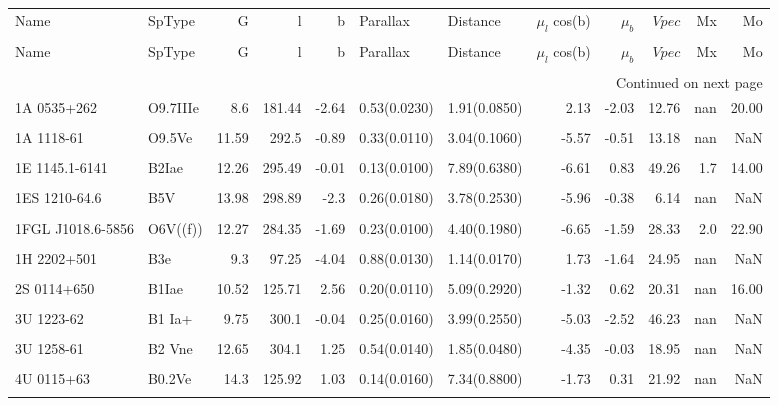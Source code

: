 \begin{longtable}{llrrrllrrrrr}
\toprule
Name & SpType & G & l & b & Parallax & Distance & $\mu_l$ cos(b) & $\mu_b$ & $V pec$ & Mx & Mo \\ \\
\midrule
\endfirsthead
\toprule
Name & SpType & G & l & b & Parallax & Distance & $\mu_l$ cos(b) & $\mu_b$ & $V pec$ & Mx & Mo \\ \\
\midrule
\endhead
\midrule
\multicolumn{12}{r}{Continued on next page} \\
\midrule
\endfoot
\bottomrule
\endlastfoot
1A 0535+262 & O9.7IIIe & 8.6 & 181.44 & -2.64 & 0.53(0.0230) & 1.91(0.0850) & 2.13 & -2.03 & 12.76 & nan & 20.00 \\ \\
1A 1118-61 & O9.5Ve & 11.59 & 292.5 & -0.89 & 0.33(0.0110) & 3.04(0.1060) & -5.57 & -0.51 & 13.18 & nan & NaN \\ \\
1E 1145.1-6141 & B2Iae & 12.26 & 295.49 & -0.01 & 0.13(0.0100) & 7.89(0.6380) & -6.61 & 0.83 & 49.26 & 1.7 & 14.00 \\ \\
1ES 1210-64.6 & B5V & 13.98 & 298.89 & -2.3 & 0.26(0.0180) & 3.78(0.2530) & -5.96 & -0.38 & 6.14 & nan & NaN \\ \\
1FGL J1018.6-5856 & O6V((f)) & 12.27 & 284.35 & -1.69 & 0.23(0.0100) & 4.40(0.1980) & -6.65 & -1.59 & 28.33 & 2.0 & 22.90 \\ \\
1H 2202+501 & B3e & 9.3 & 97.25 & -4.04 & 0.88(0.0130) & 1.14(0.0170) & 1.73 & -1.64 & 24.95 & nan & NaN \\ \\
2S 0114+650 & B1Iae & 10.52 & 125.71 & 2.56 & 0.20(0.0110) & 5.09(0.2920) & -1.32 & 0.62 & 20.31 & nan & 16.00 \\ \\
3U 1223-62 & B1 Ia+ & 9.75 & 300.1 & -0.04 & 0.25(0.0160) & 3.99(0.2550) & -5.03 & -2.52 & 46.23 & nan & NaN \\ \\
3U 1258-61 & B2 Vne & 12.65 & 304.1 & 1.25 & 0.54(0.0140) & 1.85(0.0480) & -4.35 & -0.03 & 18.95 & nan & NaN \\ \\
4U 0115+63 & B0.2Ve & 14.3 & 125.92 & 1.03 & 0.14(0.0160) & 7.34(0.8800) & -1.73 & 0.31 & 21.92 & nan & NaN \\ \\

\end{longtable}
